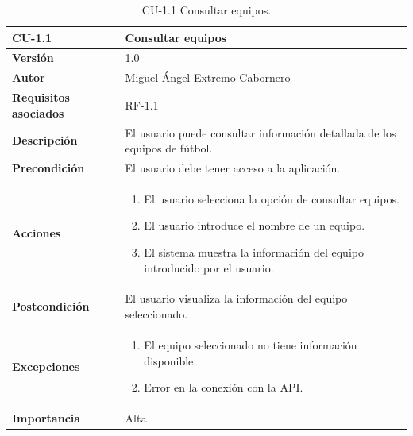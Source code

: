 \begin{table}[p]
    \centering
    \begin{tabularx}{\linewidth}{ p{} p{} }
        \toprule
        \textbf{CU-1.1}    & \textbf{Consultar equipos}\\
        \toprule
        \textbf{Versión}              & 1.0    \\
        \textbf{Autor}                & Miguel Ángel Extremo Cabornero \\
        \textbf{Requisitos asociados} & RF-1.1 \\
        \textbf{Descripción}          & El usuario puede consultar información detallada de los equipos de fútbol. \\
        \textbf{Precondición}         & El usuario debe tener acceso a la aplicación. \\
        \textbf{Acciones}             &
        \begin{enumerate}
            \item El usuario selecciona la opción de consultar equipos.
            \item El usuario introduce el nombre de un equipo.
            \item El sistema muestra la información del equipo introducido por el usuario.
        \end{enumerate}\\
        \textbf{Postcondición}        & El usuario visualiza la información del equipo seleccionado. \\
        \textbf{Excepciones}          & 
        \begin{enumerate}
            \item El equipo seleccionado no tiene información disponible.
            \item Error en la conexión con la API.
        \end{enumerate}\\
        \textbf{Importancia}          & Alta \\
        \bottomrule
    \end{tabularx}
    \caption{CU-1.1 Consultar equipos.}
\end{table}


